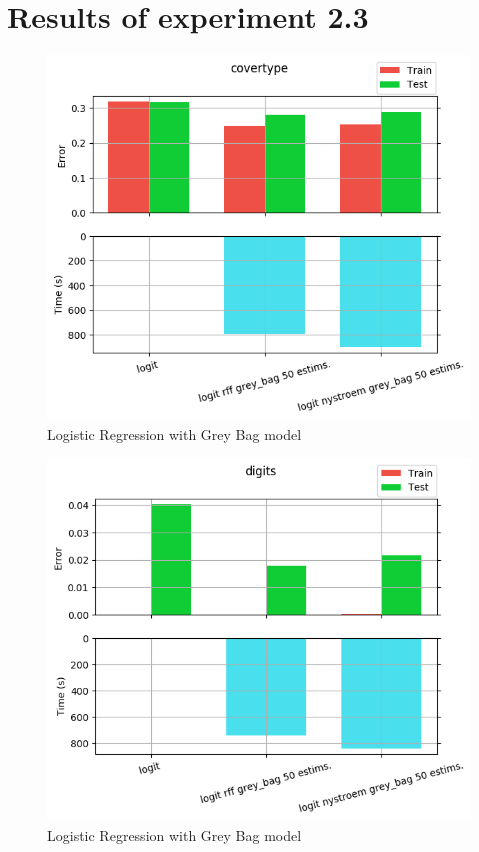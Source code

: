 
\chapter{Results of experiment 2.3} %

\label{Appendix2-3} %

\begin{figure}[th]
\centering
\includegraphics[scale=\imgscale]{Figures/2_3/covertype}
\decoRule
\caption[2.3 covertype]{Logistic Regression with Grey Bag model}
\label{fig:2_3_covertype}
\end{figure}

\begin{figure}[th]
\centering
\includegraphics[scale=\imgscale]{Figures/2_3/digits}
\decoRule
\caption[2.3 digits]{Logistic Regression with Grey Bag model}
\label{fig:2_3_digits}
\end{figure}

